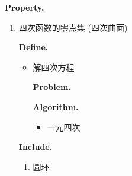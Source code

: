 \documentclass{article}
\begin{document}
\begin{enumerate}
\begin{enumerate}
			\textbf{Property. }\par
				\begin{enumerate}\par
				\item 四次函数的零点集 (四次曲面)\par
					\textbf{Define. }\par
					\begin{itemize}
					\item 解四次方程\par
						\textbf{Problem. }\par
						\textbf{Algorithm. }\par
							\begin{itemize}
							\item 一元四次\par
							\end{itemize}
					\end{itemize}
					\textbf{Include. }\par
						\begin{enumerate}\par
						\item 圆环\par
						\end{enumerate}\par
				\end{enumerate}\par
		\end{enumerate}\par
\end{enumerate}\par
\end{document}
